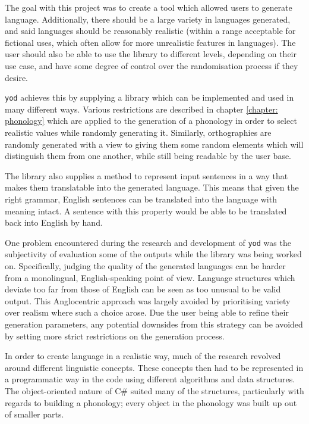 \documentclass{report}
\newcommand{\Csh}{C{\lserif\#}}
\begin{document}
	The goal with this project was to create a tool which allowed users to generate language. Additionally, there should be a large variety in languages generated, and said languages should be reasonably realistic (within a range acceptable for fictional uses, which often allow for more unrealistic features in languages). The user should also be able to use the library to different levels, depending on their use case, and have some degree of control over the randomisation process if they desire.
	
	\texttt{yod} achieves this by supplying a library which can be implemented and used in many different ways. Various restrictions are described in chapter \ref{chapter: phonology} which are applied to the generation of a phonology in order to select realistic values while randomly generating it. Similarly, orthographies are randomly generated with a view to giving them some random elements which will distinguish them from one another, while still being readable by the user base.
	
	The library also supplies a method to represent input sentences in a way that makes them translatable into the generated language. This means that given the right grammar, English sentences can be translated into the language with meaning intact. A sentence with this property would be able to be translated back into English by hand.
	
	One problem encountered during the research and development of \texttt{yod} was the subjectivity of evaluation some of the outputs while the library was being worked on. Specifically, judging the quality of the generated languages can be harder from a monolingual, English-speaking point of view. Language structures which deviate too far from those of English can be seen as too unusual to be valid output. This Anglocentric approach was largely avoided by prioritising variety over realism where such a choice arose. Due the user being able to refine their generation parameters, any potential downsides from this strategy can be avoided by setting more strict restrictions on the generation process.
	
	In order to create language in a realistic way, much of the research revolved around different linguistic concepts. These concepts then had to be represented in a programmatic way in the code using different algorithms and data structures. The object-oriented nature of \Csh{} suited many of the structures, particularly with regards to building a phonology; every object in the phonology was built up out of smaller parts.
	
\end{document}
